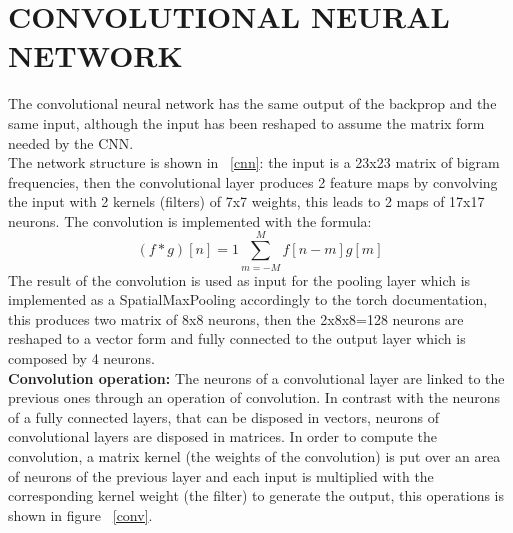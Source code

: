 \documentclass[a4paper, 10pt, conference]{ieeeconf}      %
\begin{document}
\section{CONVOLUTIONAL NEURAL NETWORK}\label{sec:cnn}
The convolutional neural network has the same output of the backprop and the same input, although the input has been reshaped to assume the matrix form needed by the CNN.\\
 The network structure is shown in  ~\ref{cnn}: the input is a 23x23 matrix of bigram frequencies, then the convolutional layer produces 2 feature maps by convolving the input with 2 kernels (filters) of 7x7 weights, this leads to 2 maps of 17x17 neurons. The convolution is implemented with the formula:
 \[ (f*g)[n]=1\sum_{m=-M}^{M}f[n-m]g[m] \]
 The result of the convolution is used as input for the pooling layer which is implemented as a SpatialMaxPooling accordingly to the torch documentation\cite{subsampling}, this produces two matrix of 8x8 neurons, then the 2x8x8=128 neurons are reshaped to a vector form and fully connected to the output layer which is composed by 4 neurons.\\
 \textbf{Convolution operation:}
 The neurons of a convolutional layer are linked
 to the previous ones through an operation of
 convolution. In contrast with the neurons of a fully
 connected layers, that can be disposed in vectors,
 neurons of convolutional layers are disposed in
 matrices. In order to compute the convolution,
 a matrix kernel (the weights of the convolution)
 is put over an area of neurons of the previous
 layer and each input is multiplied with the corresponding
 kernel weight (the filter) to generate the
 output, this operations is shown in figure ~\ref{conv}.\\
\end{document}
